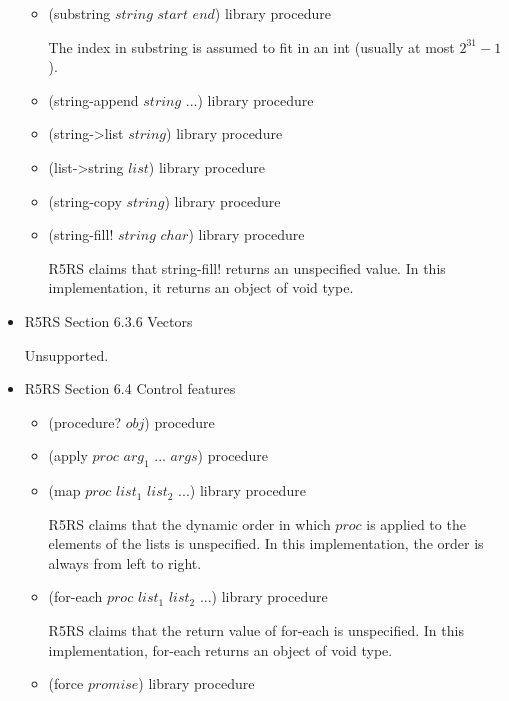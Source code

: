 \documentclass{article}
\begin{document}
\begin{itemize}
\begin{itemize}
		\item (substring $string$ $start$ $end$)	\hfill	library procedure
		
		The index in substring is assumed to fit in an int (usually at most $2^{31}-1$).
		
		\item (string-append $string$ ...)	\hfill	library procedure
		
		\item (string->list $string$)	\hfill	library procedure
		\item (list->string $list$)	\hfill	library procedure
		
		\item (string-copy $string$)	\hfill	library procedure
		\item (string-fill! $string$ $char$)	\hfill	library procedure 
		
		R5RS claims that string-fill! returns an unspecified value. In this implementation, it returns an object of void type.
				
	\end{itemize}
	
\item R5RS Section 6.3.6 Vectors
	
	Unsupported.
	
\item R5RS Section 6.4 Control features
	\begin{itemize}
		\item (procedure? $obj$)	\hfill	procedure
		
		\item (apply $proc$ $arg_1$ ... $args$)	\hfill	procedure
		
		\item (map $proc$ $list_1$ $list_2$ ...)	\hfill	library procedure
		
		R5RS claims that the dynamic order in which $proc$ is applied to the elements of the lists is unspecified. In this implementation, the order is always from left to right.
		
		\item (for-each $proc$ $list_1$ $list_2$ ...)	\hfill	library procedure
		
		R5RS claims that the return value of for-each is unspecified. In this implementation, for-each returns an object of void type.
		
		\item (force $promise$)	\hfill	library procedure		
	\end{itemize}
	

\end{itemize}
\end{document}
